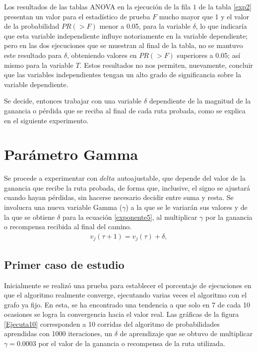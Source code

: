 Los resultados de las tablas ANOVA en la ejecución de la fila $1$ de la tabla \ref{exp2} presentan un valor para el estadístico de prueba $F$ mucho mayor que 1 y el valor de la probabilidad $PR(>F)$ menor a 0.05, para la variable $\delta$, lo que indicaría que esta variable independiente influye notoriamente en la variable dependiente; pero en las dos ejecuciones que se muestran al final de la tabla, no se mantuvo este resultado para $\delta$, obteniendo valores en $PR(>F)$ superiores a 0.05; así mismo para la variable $T$. Estos resultados no nos permiten, nuevamente, concluir que las variables independientes tengan un alto grado de significancia sobre la variable dependiente.

Se decide, entonces trabajar con una variable $\delta$ dependiente de la magnitud de la ganancia o pérdida que se reciba al final de cada ruta probada, como se explica en el siguiente experimento.

\section{Parámetro Gamma}

Se procede a experimentar con $delta$ autoajustable, que depende del valor de la ganancia que recibe la ruta probada, de forma que, inclusive, el signo se ajustará cuando hayan pérdidas, sin hacerse necesario decidir entre suma y resta. Se involucra una nueva variable Gamma ($\gamma$) a la que se le variarán sus valores y de la que se obtiene $\delta$ para la ecuación \ref{exponente5}, al multiplicar $\gamma$ por la ganancia o recompensa recibida al final del camino.
\begin{eqnarray}\label{exponente5}
v_j(\tau + 1) = v_j(\tau) + \delta,
\end{eqnarray}

\subsection{Primer caso de estudio}

Inicialmente se realizó una prueba para establecer el porcentaje de ejecuciones en que el algoritmo realmente converge, ejecutando varias veces el algoritmo con el grafo ya fijo. En esta, se ha encontrado una tendencia a que solo en 7 de cada 10 ocasiones se logra la convergencia hacia el valor real. Las gráficas de la figura \ref{Ejecuta10} corresponden a 10 corridas del algoritmo de probabilidades aprendidas con 1000 iteraciones, un $\delta$ de aprendizaje que se obtuvo de multiplicar $\gamma = 0.0003$ por el valor de la ganancia o recompensa de la ruta utilizada.

